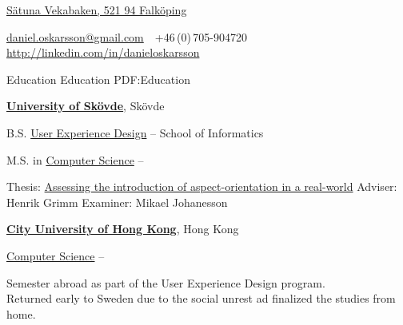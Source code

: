 \documentclass[letterpaper,MMMyyyy,nonstopmode]{simpleresumecv}
\newcommand{\CVAuthor}{Daniel Oskarsson}
\newcommand{\CVWebpage}{http://linkedin.com/in/danieloskarsson}
\begin{document}

\Title{\CVAuthor}

\begin{SubTitle}
\href{https://www.google.com/maps/place/VEKABACKEN,+521+94+Falk%C3%B6ping/@58.3358392,13.7009896,12z/data=!4m5!3m4!1s0x465ae469d63424bf:0xb367c493ed2f945c!8m2!3d58.2692871!4d13.5626312}
{Sätuna Vekabaken, 521 94 Falköping}
\par
\href{mailto:daniel.oskarsson@gmail.com}
{daniel.oskarsson@gmail.com}
\,\SubBulletSymbol\,
+46\,(0)\,705-904720
\\
\href{\CVWebpage}
{\url{\CVWebpage}}
\end{SubTitle}

\begin{Body}


\Section
{Education}
{Education}
{PDF:Education}

\Entry
\href{http://www.example.com/my-university}
{\textbf{University of Skövde}},
Skövde

\Gap
\BulletItem
B.S.
\href{http://www.his.se/uxd}
{User Experience Design}
\hfill
{} --
\newline
School of Informatics



\Gap
\BulletItem
M.S. in
\href{http://his.se/dvp}
{Computer Science}
\hfill
{} --
\begin{Detail}
\SubBulletItem
Thesis:
\href{http://urn.kb.se/resolve?urn=urn:nbn:se:his:diva-13461}
{Assessing the introduction of aspect-orientation in a real-world}
\SubBulletItem
Adviser:
Henrik Grimm
\SubBulletItem
Examiner:
Mikael Johanesson
\end{Detail}
    
\BigGap
\Entry
\href{http://cityu.edu.hk}
{\textbf{City University of Hong Kong}}, Hong Kong

\Gap
\BulletItem
\href{https://cs.cityu.edu.hk/courses/exchange.html}
{Computer Science}
\hfill
{} --
\begin{Detail}
\SubBulletItem
Semester abroad as part of the User Experience Design program.\\Returned early to Sweden due to the social unrest ad finalized the studies from home.
\end{Detail}


\end{Body}
\end{document}
